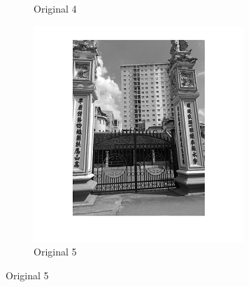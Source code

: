 \begin{center}
\begin{figure}[h]
\begin{subfigure}[b]{0.18\textwidth}
                 \caption{Original 4}
                  \label{fig:original 4}
        \end{subfigure}
        \begin{subfigure}[b]{0.18\textwidth}
                        \includegraphics[width=\linewidth]{pagoda5.png}
                         \caption{Original 5}
                          \label{fig:original 5}
                \end{subfigure}
      \end{figure}
\end{center}
\vspace{2cm}

